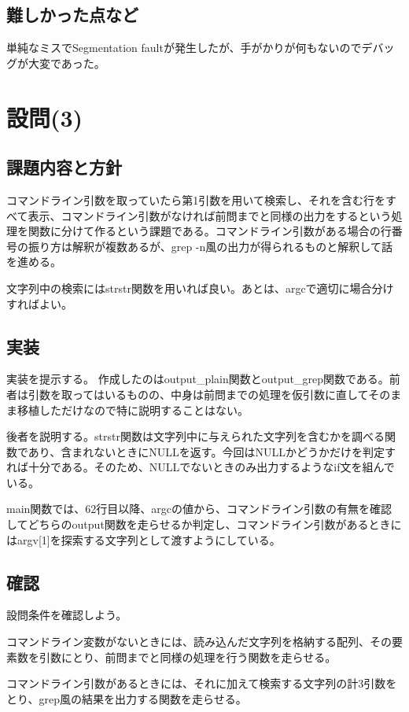 \documentclass[dvipdfmx,12pt,a4j]{jarticle}
\begin{document}
\subsection{難しかった点など}
単純なミスでSegmentation faultが発生したが、手がかりが何もないのでデバッグが大変であった。

\section{設問(3)}
\subsection{課題内容と方針}
コマンドライン引数を取っていたら第1引数を用いて検索し、それを含む行をすべて表示、コマンドライン引数がなければ前問までと同様の出力をするという処理を関数に分けて作るという課題である。コマンドライン引数がある場合の行番号の振り方は解釈が複数あるが、grep -n風の出力が得られるものと解釈して話を進める。

文字列中の検索にはstrstr関数を用いれば良い。あとは、argcで適切に場合分けすればよい。

\subsection{実装}
実装を提示する。
作成したのはoutput\_plain関数とoutput\_grep関数である。前者は引数を取ってはいるものの、中身は前問までの処理を仮引数に直してそのまま移植しただけなので特に説明することはない。

後者を説明する。strstr関数は文字列中に与えられた文字列を含むかを調べる関数であり、含まれないときにNULLを返す。今回はNULLかどうかだけを判定すれば十分である。そのため、NULLでないときのみ出力するようなif文を組んでいる。

main関数では、62行目以降、argcの値から、コマンドライン引数の有無を確認してどちらのoutput関数を走らせるか判定し、コマンドライン引数があるときにはargv[1]を探索する文字列として渡すようにしている。



\subsection{確認}
設問条件を確認しよう。

コマンドライン変数がないときには、読み込んだ文字列を格納する配列、その要素数を引数にとり、前問までと同様の処理を行う関数を走らせる。

コマンドライン引数があるときには、それに加えて検索する文字列の計3引数をとり、grep風の結果を出力する関数を走らせる。
\end{document}
